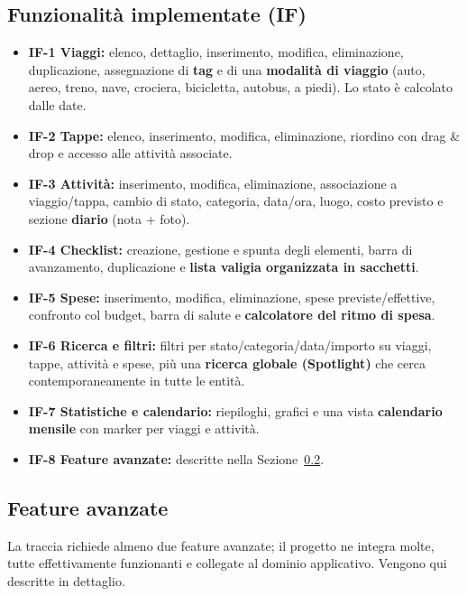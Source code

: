 \documentclass[11pt, a4paper]{article}
\begin{document}
\subsection{Funzionalità implementate (IF)}
\begin{itemize}[noitemsep]
    \item \textbf{IF-1 Viaggi:} elenco, dettaglio, inserimento, modifica,
    eliminazione, duplicazione, assegnazione di \textbf{tag} e di una
    \textbf{modalità di viaggio} (auto, aereo, treno, nave, crociera, bicicletta,
    autobus, a piedi). Lo stato è calcolato dalle date.
    \item \textbf{IF-2 Tappe:} elenco, inserimento, modifica, eliminazione,
    riordino con drag \& drop e accesso alle attività associate.
    \item \textbf{IF-3 Attività:} inserimento, modifica, eliminazione,
    associazione a viaggio/tappa, cambio di stato, categoria, data/ora, luogo,
    costo previsto e sezione \textbf{diario} (nota + foto).
    \item \textbf{IF-4 Checklist:} creazione, gestione e spunta degli elementi,
    barra di avanzamento, duplicazione e \textbf{lista valigia organizzata in
    sacchetti}.
    \item \textbf{IF-5 Spese:} inserimento, modifica, eliminazione, spese
    previste/effettive, confronto col budget, barra di salute e
    \textbf{calcolatore del ritmo di spesa}.
    \item \textbf{IF-6 Ricerca e filtri:} filtri per stato/categoria/data/importo
    su viaggi, tappe, attività e spese, più una \textbf{ricerca globale
    (Spotlight)} che cerca contemporaneamente in tutte le entità.
    \item \textbf{IF-7 Statistiche e calendario:} riepiloghi, grafici e una vista
    \textbf{calendario mensile} con marker per viaggi e attività.
    \item \textbf{IF-8 Feature avanzate:} descritte nella Sezione~\ref{sec:adv}.
\end{itemize}

\subsection{Feature avanzate}\label{sec:adv}
La traccia richiede almeno due feature avanzate; il progetto ne integra molte,
tutte effettivamente funzionanti e collegate al dominio applicativo. Vengono qui
descritte in dettaglio.
\end{document}
